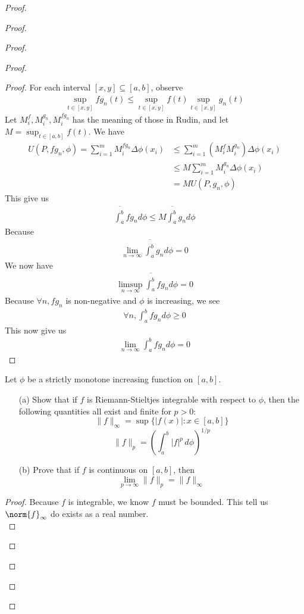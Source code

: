 \documentclass{report}
\begin{document}
\begin{proof}
\begin{proof}
\begin{proof}
\begin{proof}
\begin{proof}
For each interval $[x,y]\subseteq [a,b]$, observe 
\begin{align*}
\sup_{t\in [x,y]}fg_n(t)\leq \sup_{t \in [x,y]} f(t)\sup_{t \in [x,y]} g_n(t)
\end{align*}
Let $M_i^f,M_i^{g_n},M_i^{fg_n}$ has the meaning of those in Rudin, and let $M=\sup_{t \in [a,b]} f(t)$. We have 
\begin{align*}
  U(P,fg_n,\phi)=\sum_{i=1}^m M_{i}^{fg_n} \Delta \phi (x_i)&\leq \sum_{i=1}^m (M_i^f M_i^{g_n})\Delta  \phi (x_i)\\
&\leq M \sum_{i=1}^m M_i^{g_n}\Delta \phi (x_i)\\
&=M U(P,g_n,\phi)
\end{align*}
This give us 
\begin{align*}
\overline{\int_a^b}fg_n d\phi \leq M \overline{\int_a^b}g_n d\phi
\end{align*}
Because  
\begin{align*}
\lim_{n\to \infty}\overline{\int_a^b}g_n d\phi = 0
\end{align*}
We now have 
\begin{align*}
\limsup_{n\to\infty} \overline{\int_a^b}fg_nd\phi =0
\end{align*}
Because $\forall n,fg_n$ is non-negative and $\phi$ is increasing, we see  
\begin{align*}
\forall n,\int_a^b fg_n d\phi \geq 0
\end{align*}
This now give us 
\begin{align*}
\lim_{n \to \infty}\int_a^b fg_n d\phi =0
\end{align*}
 

\end{proof}

\begin{question}{}{}

Let \( \phi \) be a strictly monotone increasing function on \( [a, b] \).
\begin{enumerate}
\item[(a)] Show that if \( f \) is Riemann-Stieltjes integrable with respect to \( \phi \), then the following quantities all exist and finite for \( p > 0 \):
\[ \|f\|_\infty = \sup\{|f(x)| : x \in [a, b]\} \]
\[ \|f\|_p = \left( \int_{a}^{b} |f|^p \, d\phi \right)^{1/p} \]

\item[(b)] Prove that if \( f \) is continuous on \( [a, b] \), then
\[ \lim_{p \to \infty} \|f\|_p = \|f\|_\infty \]
\end{enumerate}
\end{question}
\begin{proof}
Because $f$ is integrable, we know  $f$ must be bounded. This tell us $\norm{f}_{\infty}$ do exists as a real number. \\


\end{proof}
\end{proof}
\end{proof}
\end{proof}
\end{proof}
\end{document}
